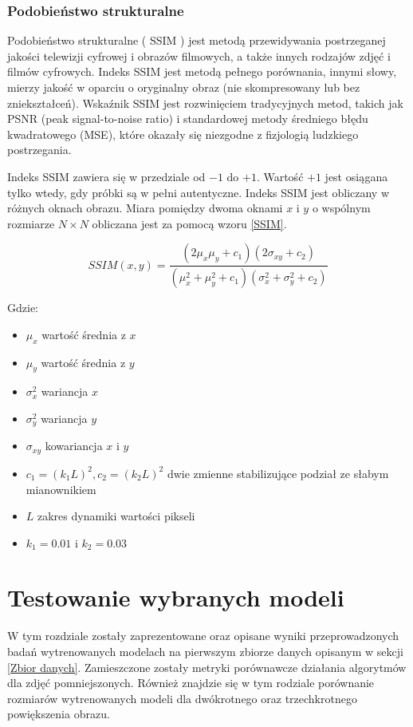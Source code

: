\documentclass[a4paper,12pt,twoside,openany]{report}
\begin{document}
\subsection{Podobieństwo strukturalne}
Podobieństwo strukturalne ( SSIM ) jest metodą przewidywania postrzeganej jakości telewizji cyfrowej i obrazów filmowych, a także innych rodzajów zdjęć i filmów cyfrowych. Indeks SSIM jest metodą pełnego porównania, innymi słowy, mierzy jakość w oparciu o oryginalny obraz (nie skompresowany lub bez zniekształceń). Wskaźnik SSIM jest rozwinięciem tradycyjnych metod, takich jak PSNR (peak signal-to-noise ratio) i standardowej metody średniego błędu kwadratowego (MSE), które okazały się niezgodne z fizjologią ludzkiego postrzegania. 

Indeks SSIM zawiera się w przedziale od $-1$ do $+1$. Wartość $+1$ jest osiągana tylko wtedy, gdy próbki są w pełni autentyczne. Indeks SSIM jest obliczany w różnych oknach obrazu. Miara pomiędzy dwoma oknami $x$ i $y$ o wspólnym rozmiarze $N \times N$ obliczana jest za pomocą wzoru \ref{SSIM}. 

\begin{equation}
	SSIM(x,y)= \frac{(2\mu_x\mu_y+c_1)(2\sigma_{xy}+c_2)}{(\mu_x^2+\mu_y^2+c_1)(\sigma_x^2+\sigma_y^2+c_2)}
	\label{SSIM}
\end{equation}

Gdzie: 
\begin{itemize}
	\item $\mu_x$ wartość średnia z $x$
	\item $\mu_y$ wartość średnia z $y$
	\item $\sigma_x^2$ wariancja $x$
	\item $\sigma_y^2$ wariancja $y$
	\item $\sigma_{xy}$ kowariancja $x$ i $y$
	\item $c_1=(k_1L)^2, c_2=(k_2L)^2$ dwie zmienne stabilizujące podział ze słabym mianownikiem
	\item $L$ zakres dynamiki wartości pikseli 
	\item $k_1=0.01$ i $k_2=0.03$
\end{itemize}
\chapter{Testowanie wybranych  modeli}
W tym rozdziale zostały zaprezentowane oraz opisane wyniki przeprowadzonych badań  wytrenowanych modelach na pierwszym zbiorze danych opisanym w sekcji \ref{Zbior danych}. Zamieszczone zostały metryki porównawcze działania algorytmów dla zdjęć pomniejszonych. Również znajdzie się w tym rodziale porównanie rozmiarów wytrenowanych modeli dla dwókrotnego oraz trzechkrotnego powiększenia  obrazu.
\end{document}
